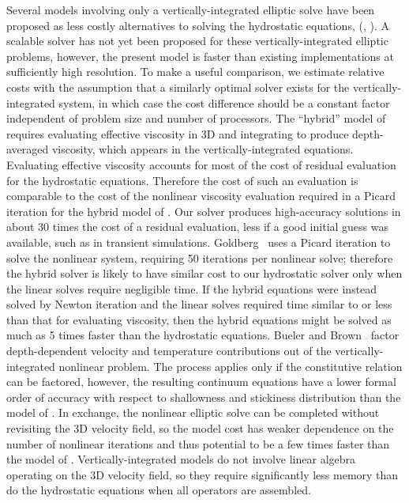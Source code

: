 Several models involving only a vertically-integrated elliptic solve have been proposed as less costly alternatives to solving the hydrostatic equations, (\eg, \citep{bueler2009shallow,goldberg2009grounding,goldberg2011variationally}).
A scalable solver has not yet been proposed for these vertically-integrated elliptic problems, however, the present model is faster than existing implementations at sufficiently high resolution.
To make a useful comparison, we estimate relative costs with the assumption that a similarly optimal solver exists for the vertically-integrated system, in which case the cost difference should be a constant factor independent of problem size and number of processors.
The ``hybrid'' model of \citet{goldberg2011variationally} requires evaluating effective viscosity in 3D and integrating to produce depth-averaged viscosity, which appears in the vertically-integrated equations.
Evaluating effective viscosity accounts for most of the cost of residual evaluation for the hydrostatic equations.
Therefore the cost of such an evaluation is comparable to the cost of the nonlinear viscosity evaluation required in a Picard iteration for the hybrid model of \citet{goldberg2011variationally}.
Our solver produces high-accuracy solutions in about 30 times the cost of a residual evaluation, less if a good initial guess was available, such as in transient simulations.
Goldberg~\cite{goldberg2011variationally} uses a Picard iteration to solve the nonlinear system, requiring 50 iterations per nonlinear solve; therefore the hybrid solver is likely to have similar cost to our hydrostatic solver only when the linear solves require negligible time.
If the hybrid equations were instead solved by Newton iteration and the linear solves required time similar to or less than that for evaluating viscosity, then the hybrid equations might be solved as much as 5 times faster than the hydrostatic equations.
Bueler and Brown~\cite{bueler2009shallow} factor depth-dependent velocity and temperature contributions out of the vertically-integrated nonlinear problem.
The process applies only if the constitutive relation can be factored, however, the resulting continuum equations have a lower formal order of accuracy with respect to shallowness and stickiness distribution than the model of \citet{goldberg2011variationally}.
In exchange, the nonlinear elliptic solve can be completed without revisiting the 3D velocity field, so the model cost has weaker dependence on the number of nonlinear iterations and thus potential to be a few times faster than the model of \citet{goldberg2011variationally}.
Vertically-integrated models do not involve linear algebra operating on the 3D velocity field, so they require significantly less memory than do the hydrostatic equations when all operators are assembled.

